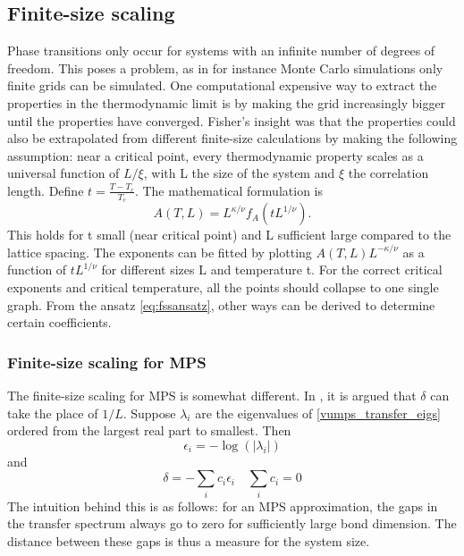 \subsection{Finite-size scaling}\label{subsec:fss}

Phase transitions only occur for systems with an infinite number of degrees of freedom. This poses a problem, as in for instance Monte Carlo simulations only finite grids can be simulated. One computational expensive way to extract the properties in the thermodynamic limit is by making the grid increasingly bigger until the properties have converged. Fisher's  insight was that the properties could also be extrapolated from different finite-size calculations by making the following assumption: near a critical point, every thermodynamic property scales as a universal function of $L/\xi$, with L the size of the system and $\xi$ the correlation length.
Define $t=\frac{T-T_c}{T_c}$. The mathematical formulation is
\begin{equation}\label{eq:fssansatz}
    A(T,L) = L^{\kappa / \nu} f_A( t L ^{1/ \nu} ).
\end{equation}
This holds for t small (near critical point) and L sufficient large compared to the lattice spacing. The exponents can be fitted by plotting $A(T,L)  L^{-\kappa / \nu} $ as a function of $t L ^{1/ \nu}$ for different sizes L and temperature t. For the correct critical exponents and critical temperature, all the points should collapse to one single graph. From the ansatz \cref{eq:fssansatz}, other ways can be derived to determine certain coefficients.


\subsubsection{Finite-size scaling for MPS}

The finite-size scaling for MPS is somewhat different. In \cite{Vanhecke2019}, it is argued that $\delta$ can take the place of $1/L$. Suppose $\lambda_i$ are the eigenvalues of \cref{vumps_transfer_eigs} ordered from the largest real part to smallest. Then
\begin{equation}
    \epsilon_i = - \log( \left | \lambda_i  \right |  )
\end{equation}
and
\begin{equation} \label{eq:cit_delta}
    \delta = - \sum_i c_i \epsilon_i  \quad \sum_i c_i = 0
\end{equation}
The intuition behind this is as follows: for an MPS approximation, the gaps in the transfer spectrum always go to zero for sufficiently large bond dimension. The distance between these gaps is thus a measure for the system size.

